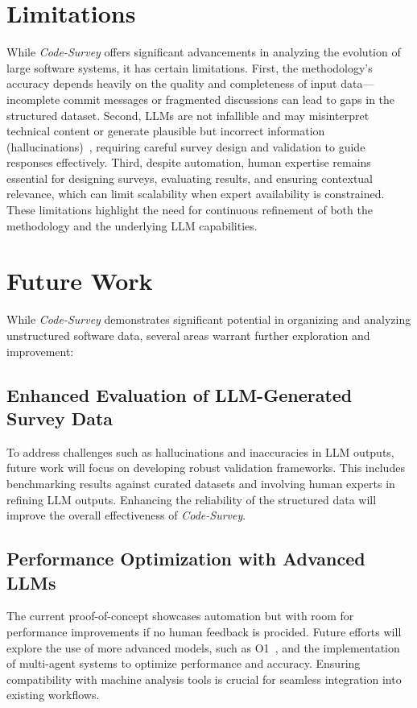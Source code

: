 \section{Limitations}
\label{sec:limitations}

While \emph{Code-Survey} offers significant advancements in analyzing the evolution of large software systems, it has certain limitations. First, the methodology's accuracy depends heavily on the quality and completeness of input data—incomplete commit messages or fragmented discussions can lead to gaps in the structured dataset. Second, LLMs are not infallible and may misinterpret technical content or generate plausible but incorrect information (hallucinations)~\cite{ji2023survey,bubeck2023sparks}, requiring careful survey design and validation to guide responses effectively. Third, despite automation, human expertise remains essential for designing surveys, evaluating results, and ensuring contextual relevance, which can limit scalability when expert availability is constrained. These limitations highlight the need for continuous refinement of both the methodology and the underlying LLM capabilities.

\section{Future Work}
\label{sec:future}

While \emph{Code-Survey} demonstrates significant potential in organizing and analyzing unstructured software data, several areas warrant further exploration and improvement:

\subsection{Enhanced Evaluation of LLM-Generated Survey Data}

To address challenges such as hallucinations and inaccuracies in LLM outputs, future work will focus on developing robust validation frameworks. This includes benchmarking results against curated datasets and involving human experts in refining LLM outputs. Enhancing the reliability of the structured data will improve the overall effectiveness of \emph{Code-Survey}.

\subsection{Performance Optimization with Advanced LLMs}

The current proof-of-concept showcases automation but with room for performance improvements if no human feedback is procided. Future efforts will explore the use of more advanced models, such as O1~\cite{o1}, and the implementation of multi-agent systems to optimize performance and accuracy. Ensuring compatibility with machine analysis tools is crucial for seamless integration into existing workflows.

